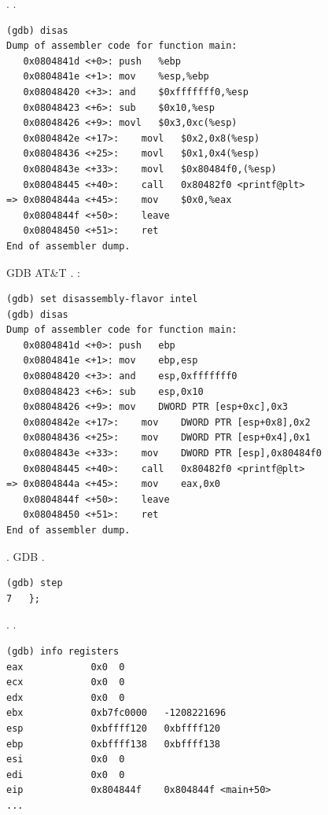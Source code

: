 .
.

\begin{lstlisting}
(gdb) disas
Dump of assembler code for function main:
   0x0804841d <+0>:	push   %ebp
   0x0804841e <+1>:	mov    %esp,%ebp
   0x08048420 <+3>:	and    $0xfffffff0,%esp
   0x08048423 <+6>:	sub    $0x10,%esp
   0x08048426 <+9>:	movl   $0x3,0xc(%esp)
   0x0804842e <+17>:	movl   $0x2,0x8(%esp)
   0x08048436 <+25>:	movl   $0x1,0x4(%esp)
   0x0804843e <+33>:	movl   $0x80484f0,(%esp)
   0x08048445 <+40>:	call   0x80482f0 <printf@plt>
=> 0x0804844a <+45>:	mov    $0x0,%eax
   0x0804844f <+50>:	leave  
   0x08048450 <+51>:	ret    
End of assembler dump.
\end{lstlisting}

\ac{GDB}  AT\&T 
.
:

\begin{lstlisting}
(gdb) set disassembly-flavor intel
(gdb) disas
Dump of assembler code for function main:
   0x0804841d <+0>:	push   ebp
   0x0804841e <+1>:	mov    ebp,esp
   0x08048420 <+3>:	and    esp,0xfffffff0
   0x08048423 <+6>:	sub    esp,0x10
   0x08048426 <+9>:	mov    DWORD PTR [esp+0xc],0x3
   0x0804842e <+17>:	mov    DWORD PTR [esp+0x8],0x2
   0x08048436 <+25>:	mov    DWORD PTR [esp+0x4],0x1
   0x0804843e <+33>:	mov    DWORD PTR [esp],0x80484f0
   0x08048445 <+40>:	call   0x80482f0 <printf@plt>
=> 0x0804844a <+45>:	mov    eax,0x0
   0x0804844f <+50>:	leave  
   0x08048450 <+51>:	ret    
End of assembler dump.
\end{lstlisting}

.
\ac{GDB} .

\begin{lstlisting}
(gdb) step
7	};
\end{lstlisting}

.
\EAX {}.

\begin{lstlisting}
(gdb) info registers
eax            0x0	0
ecx            0x0	0
edx            0x0	0
ebx            0xb7fc0000	-1208221696
esp            0xbffff120	0xbffff120
ebp            0xbffff138	0xbffff138
esi            0x0	0
edi            0x0	0
eip            0x804844f	0x804844f <main+50>
...
\end{lstlisting}
\fi
